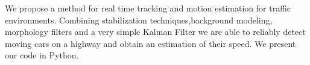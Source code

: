 We propose a method for real time tracking and motion estimation for traffic environments.
Combining stabilization techniques,background modeling, morphology filters and a very
 simple Kalman Filter we are able to reliably detect moving cars on a highway and obtain
an estimation of their speed. We present our code in Python.
